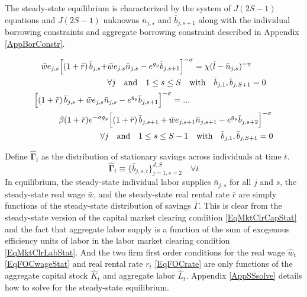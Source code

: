 \documentclass[letterpaper,12pt]{article}
\theoremstyle{definition}
\begin{document}
    \begin{spacing}{1.5}
    \vspace{10mm}

    The steady-state equilibrium is characterized by the system of $J(2S-1)$ equations and $J(2S-1)$ unknowns $\bar{n}_{j,s}$ and $\bar{b}_{j,s+1}$ along with the individual borrowing constraints and aggregate borrowing constraint described in Appendix \ref{AppBorConstr}.

    \begin{gather}
      \begin{split}
        \bar{w}e_{j,s}\Bigl[\left(1+\bar{r}\right)\bar{b}_{j,s} + &\bar{w} e_{j,s}\bar{n}_{j,s} - e^{g_y}\bar{b}_{j,s+1}\Bigr]^{-\sigma} = \chi(\tilde{l} - \bar{n}_{j,s})^{-\eta} \\
        &\forall j \quad\text{and}\quad 1\leq s\leq S \quad\text{with}\quad \bar{b}_{j,1},\bar{b}_{j,S+1}=0
      \end{split} \label{EqEulerLabSS} \\
      \begin{split}
        &\Bigl[\left(1+\bar{r}\right)\bar{b}_{j,s} + \bar{w}e_{j,s}\bar{n}_{j,s} - e^{g_y}\bar{b}_{j,s+1}\Bigr]^{-\sigma} = ... \\
        &\quad\quad\quad \beta(1+\bar{r})e^{-\sigma g_y}\Bigl[\left(1+\bar{r}\right)\bar{b}_{j,s+1} + \bar{w}e_{j,s+1}\bar{n}_{j,s+1} - e^{g_y}\bar{b}_{j,s+2}\Bigr]^{-\sigma} \\
        &\quad\quad\quad\quad\quad\quad\quad\quad\forall j \quad\text{and}\quad 1\leq s\leq S-1 \quad\text{with}\quad \bar{b}_{j,1},\bar{b}_{j,S+1}=0
      \end{split} \label{EqEulerSavSS}
    \end{gather}

    Define $\bm{\hat{\Gamma}}_t$ as the distribution of stationary savings across individuals at time $t$.
    \begin{equation}\label{EqSavDist}
      \bm{\hat{\Gamma}}_t \equiv \{\hat{b}_{j,s,t}\}_{j=1,s=2}^{J,S} \quad\forall t
    \end{equation}
    In equilibrium, the steady-state individual labor supplies $\bar{n}_{j,s}$ for all $j$ and $s$, the steady-state real wage $\bar{w}$, and the steady-state real rental rate $\bar{r}$ are simply functions of the steady-state distribution of savings $\bar{\Gamma}$. This is clear from the steady-state version of the capital market clearing condition \eqref{EqMktClrCapStat} and the fact that aggregate labor supply is a function of the sum of exogenous efficiency units of labor in the labor market clearing condition \eqref{EqMktClrLabStat}. And the two firm first order conditions for the real wage $\hat{w}_t$ \eqref{EqFOCwageStat} and real rental rate $r_t$ \eqref{EqFOCrate} are only functions of the aggregate capital stock $\hat{K}_t$ and aggregate labor $\hat{L}_t$. Appendix \ref{AppSSsolve} details how to solve for the steady-state equilibrium.


\end{spacing}
\end{document}
